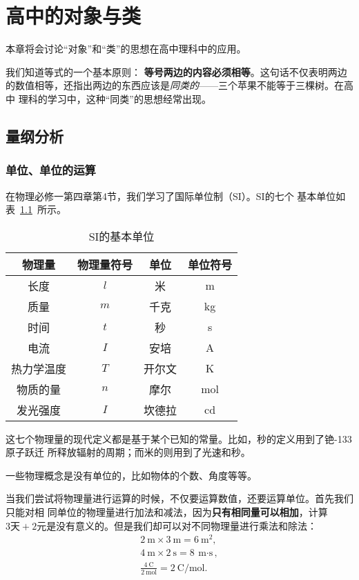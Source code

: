 \chapter{高中的对象与类}

本章将会讨论“对象”和“类”的思想在高中理科中的应用。

我们知道等式的一个基本原则： \textbf{等号两边的内容必须相等}。这句话不仅表明两边
的数值相等，还指出两边的东西应该是\emph{同类的}——三个苹果不能等于三棵树。在高中
理科的学习中，这种“同类”的思想经常出现。

\section{量纲分析}

\subsection{单位、单位的运算}

在物理必修一第四章第4节，我们学习了国际单位制（SI）。SI的七个
基本单位如表~\ref{tbl:si_units}~所示。

\begin{table}[ht]
    \centering
    \caption{SI的基本单位}\label{tbl:si_units}
    \begin{tabular}{cccc}
        \toprule
        物理量 & 物理量符号 & 单位 & 单位符号 \\
        \midrule
        长度 & $l$ & 米 & \unit{m} \\
        质量 & $m$ & 千克 & \unit{kg} \\
        时间 & $t$ & 秒 & \unit{s} \\
        电流 & $I$ & 安培 & \unit{A} \\
        热力学温度 & $T$ & 开尔文 & \unit{K} \\
        物质的量 & $n$ & 摩尔 & \unit{mol} \\
        发光强度 & $I$ & 坎德拉 & \unit{cd} \\
        \bottomrule
    \end{tabular}
\end{table}

这七个物理量的现代定义都是基于某个已知的常量。比如，秒的定义用到了铯-133原子跃迁
所释放辐射的周期；而米的则用到了光速和秒。

一些物理概念是没有单位的，比如物体的个数、角度等等。

当我们尝试将物理量进行运算的时候，不仅要运算数值，还要运算单位。首先我们只能对相
同单位的物理量进行加法和减法，因为\textbf{只有相同量可以相加}，计算$3\text{天}%
+2\text{元}$是没有意义的。但是我们却可以对不同物理量进行乘法和除法：
\begin{gather*}
    \qty{2}{\meter} \times \qty{3}{\meter} = \qty{6}{\meter^2},\\
    \qty{4}{\meter} \times \qty{2}{\second} = \qty{8}{\meter\cdot\second},\\
    \frac{\qty{4}{\coulomb}}{\qty{2}{\mole}} = \qty{2}{\coulomb\per\mole}.\\
\end{gather*}

